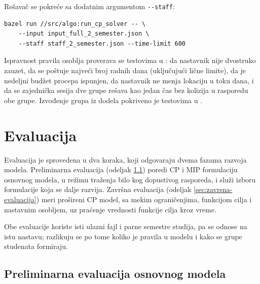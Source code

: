 \documentclass[12pt,oneside]{memoir}
\begin{document}
Rešavač se pokreće sa dodatnim argumentom \texttt{-{}-staff}:

\begin{english}
\begin{verbatim}
bazel run //src/algo:run_cp_solver -- \
    --input input_full_2_semester.json \
    --staff staff_2_semester.json --time-limit 600
\end{verbatim}
\end{english}

Ispravnost pravila osoblja proverava se testovima u
: da nastavnik nije dvostruko zauzet, da se
poštuje najveći broj radnih dana (uključujući lične limite), da je
nedeljni budžet procepa ispunjen, da nastavnik ne menja lokaciju u toku
dana, i da se zajednička sesija dve grupe rešava kao jedan čas bez
kolizija u rasporedu obe grupe. Izvođenje grupa iz dodela pokriveno je
testovima u \code{test_data.py}.



\chapter{Evaluacija}
\label{chp:evaluacija-glava}


Evaluacija je sprovedena u dva koraka, koji odgovaraju dvema fazama
razvoja modela. Preliminarna evaluacija (odeljak
\ref{sec:preliminarna-evaluacija}) poredi CP i MIP formulaciju
osnovnog modela, u režimu traženja bilo kog dopustivog rasporeda, i
služi izboru formulacije koja se dalje razvija. Završna evaluacija
(odeljak \ref{sec:zavrsna-evaluacija}) meri prošireni CP model,
sa mekim ograničenjima, funkcijom cilja i nastavnim osobljem, uz
praćenje vrednosti funkcije cilja kroz vreme.

Obe evaluacije koriste isti ulazni fajl i parne semestre
studija, pa se odnose na istu nastavu; razlikuju se po tome koliko je
pravila u modelu i kako se grupe studenata formiraju.

\section{Preliminarna evaluacija osnovnog modela}
\label{sec:preliminarna-evaluacija}
\end{document}
